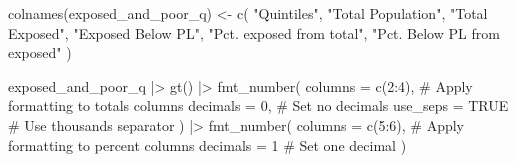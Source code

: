 \documentclass[
  letterpaper,
  DIV=11,
  numbers=noendperiod]{scrartcl}
\newenvironment{Shaded}{}{}
\newcommand{\AttributeTok}[1]{\textcolor[rgb]{0.84,0.23,0.29}{#1}}
\newcommand{\CommentTok}[1]{\textcolor[rgb]{0.42,0.45,0.49}{#1}}
\newcommand{\ConstantTok}[1]{\textcolor[rgb]{0.00,0.36,0.77}{#1}}
\newcommand{\DecValTok}[1]{\textcolor[rgb]{0.00,0.36,0.77}{#1}}
\newcommand{\FunctionTok}[1]{\textcolor[rgb]{0.44,0.26,0.76}{#1}}
\newcommand{\NormalTok}[1]{\textcolor[rgb]{0.14,0.16,0.18}{#1}}
\newcommand{\OtherTok}[1]{\textcolor[rgb]{0.44,0.26,0.76}{#1}}
\newcommand{\SpecialCharTok}[1]{\textcolor[rgb]{0.00,0.36,0.77}{#1}}
\newcommand{\StringTok}[1]{\textcolor[rgb]{0.01,0.18,0.38}{#1}}
\begin{document}
\begin{Shaded}
\begin{Highlighting}[]
\FunctionTok{colnames}\NormalTok{(exposed\_and\_poor\_q) }\OtherTok{\textless{}{-}} \FunctionTok{c}\NormalTok{(}
  \StringTok{"Quintiles"}\NormalTok{,}
  \StringTok{"Total Population"}\NormalTok{,}
  \StringTok{"Total Exposed"}\NormalTok{,}
  \StringTok{"Exposed Below PL"}\NormalTok{,}
  \StringTok{"Pct. exposed from total"}\NormalTok{,}
  \StringTok{"Pct. Below PL from exposed"}
\NormalTok{)}

\NormalTok{exposed\_and\_poor\_q }\SpecialCharTok{|\textgreater{}} 
  \FunctionTok{gt}\NormalTok{() }\SpecialCharTok{|\textgreater{}} 
  \FunctionTok{fmt\_number}\NormalTok{(}
    \AttributeTok{columns =} \FunctionTok{c}\NormalTok{(}\DecValTok{2}\SpecialCharTok{:}\DecValTok{4}\NormalTok{),   }\CommentTok{\# Apply formatting to totals columns}
    \AttributeTok{decimals =} \DecValTok{0}\NormalTok{,                 }\CommentTok{\# Set no decimals}
    \AttributeTok{use\_seps =} \ConstantTok{TRUE}               \CommentTok{\# Use thousands separator}
\NormalTok{  ) }\SpecialCharTok{|\textgreater{}} 
  \FunctionTok{fmt\_number}\NormalTok{(}
    \AttributeTok{columns =} \FunctionTok{c}\NormalTok{(}\DecValTok{5}\SpecialCharTok{:}\DecValTok{6}\NormalTok{),   }\CommentTok{\# Apply formatting to percent columns}
    \AttributeTok{decimals =} \DecValTok{1}                 \CommentTok{\# Set one decimal}
\NormalTok{  )}
\end{Highlighting}
\end{Shaded}

\begin{table}

\caption{\label{tbl-exposure-quintile}Number of people exposed to
extreme weather and poor}


\end{table}%
\end{document}
